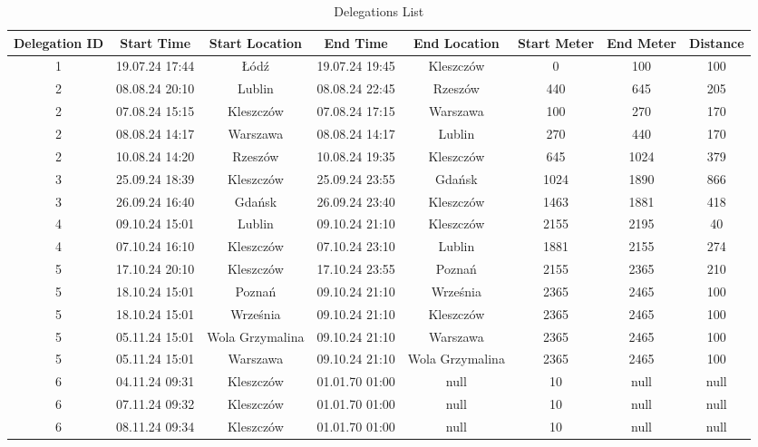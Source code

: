 
\begin{table}[h!]
\centering
\begin{tabular}{|c|c|c|c|c|c|c|c|}
\hline
Delegation ID & Start Time & Start Location & End Time & End Location & Start Meter & End Meter & Distance \\
\hline
1 & 19.07.24 17:44 & Łódź & 19.07.24 19:45 & Kleszczów & 0 & 100 & 100 \\ \hline
2 & 08.08.24 20:10 & Lublin & 08.08.24 22:45 & Rzeszów & 440 & 645 & 205 \\ \hline
2 & 07.08.24 15:15 & Kleszczów & 07.08.24 17:15 & Warszawa & 100 & 270 & 170 \\ \hline
2 & 08.08.24 14:17 & Warszawa & 08.08.24 14:17 & Lublin & 270 & 440 & 170 \\ \hline
2 & 10.08.24 14:20 & Rzeszów & 10.08.24 19:35 & Kleszczów & 645 & 1024 & 379 \\ \hline
3 & 25.09.24 18:39 & Kleszczów & 25.09.24 23:55 & Gdańsk & 1024 & 1890 & 866 \\ \hline
3 & 26.09.24 16:40 & Gdańsk & 26.09.24 23:40 & Kleszczów & 1463 & 1881 & 418 \\ \hline
4 & 09.10.24 15:01 & Lublin & 09.10.24 21:10 & Kleszczów & 2155 & 2195 & 40 \\ \hline
4 & 07.10.24 16:10 & Kleszczów & 07.10.24 23:10 & Lublin & 1881 & 2155 & 274 \\ \hline
5 & 17.10.24 20:10 & Kleszczów & 17.10.24 23:55 & Poznań & 2155 & 2365 & 210 \\ \hline
5 & 18.10.24 15:01 & Poznań & 09.10.24 21:10 & Września & 2365 & 2465 & 100 \\ \hline
5 & 18.10.24 15:01 & Września  & 09.10.24 21:10 & Kleszczów & 2365 & 2465 & 100 \\ \hline
5 & 05.11.24 15:01 & Wola Grzymalina & 09.10.24 21:10 & Warszawa & 2365 & 2465 & 100 \\ \hline
5 & 05.11.24 15:01 & Warszawa & 09.10.24 21:10 & Wola Grzymalina & 2365 & 2465 & 100 \\ \hline
6 & 04.11.24 09:31 & Kleszczów & 01.01.70 01:00 & null & 10 & null & null \\ \hline
6 & 07.11.24 09:32 & Kleszczów & 01.01.70 01:00 & null & 10 & null & null \\ \hline
6 & 08.11.24 09:34 & Kleszczów & 01.01.70 01:00 & null & 10 & null & null \\ \hline
\end{tabular}
\caption{Delegations List}
\end{table}
